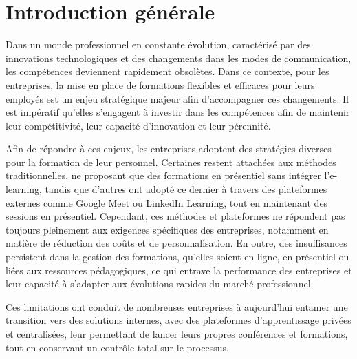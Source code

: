 \documentclass{article}
\begin{document}
\section{Introduction générale}
\begin{spacing}{1.3}
\vspace{1cm}
\hspace*{2em}Dans un monde professionnel en constante évolution, caractérisé par des innovations technologiques et des changements dans les modes de communication, les compétences deviennent rapidement obsolètes. Dans ce contexte, pour les entreprises, la mise en place de formations flexibles et efficaces pour leurs employés est un enjeu stratégique majeur afin d’accompagner ces changements. Il est impératif qu'elles s'engagent à investir dans les compétences afin de maintenir leur compétitivité, leur capacité d'innovation et leur pérennité.

\vspace{1cm}

Afin de répondre à ces enjeux, les entreprises adoptent des stratégies diverses pour la formation de leur personnel. Certaines restent attachées aux méthodes traditionnelles, ne proposant que des formations en présentiel sans intégrer l’e-learning, tandis que d’autres ont adopté ce dernier à travers des plateformes externes comme Google Meet ou LinkedIn Learning, tout en maintenant des sessions en présentiel.
Cependant, ces méthodes et plateformes ne répondent pas toujours pleinement aux exigences spécifiques des entreprises, notamment en matière de réduction des coûts et de personnalisation. En outre, des insuffisances persistent dans la gestion des formations, qu’elles soient en ligne, en présentiel ou liées aux ressources pédagogiques, ce qui entrave la performance des entreprises et leur capacité à s’adapter aux évolutions rapides du marché professionnel.




\vspace{1cm}






Ces limitations ont conduit de nombreuses entreprises à aujourd’hui entamer une transition vers des solutions internes, avec des plateformes d’apprentissage privées et centralisées, leur permettant de lancer leurs propres conférences et formations, tout en conservant un contrôle total sur le processus.




\vspace{1cm}


\end{spacing}
\end{document}
